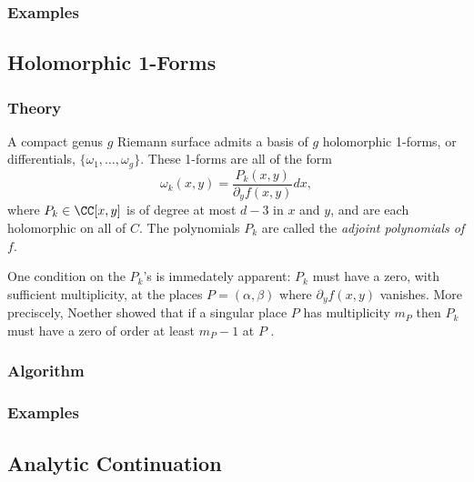 \subsubsection*{Examples}
%

\subsection{Holomorphic 1-Forms}

%
\subsubsection*{Theory}
%

A compact genus $g$ Riemann surface admits a basis of $g$ holomorphic
1-forms, or differentials, $\{\omega_1, \ldots, \omega_g\}$. These
1-forms are all of the form
\begin{equation*}
  \omega_k(x,y) = \frac{P_k(x,y)}{\partial_y f(x,y)} dx,
\end{equation*}
where $P_k \in \CC[x,y]$ is of degree at most $d-3$ in $x$ and $y$, and
are each holomorphic on all of $C$. The polynomials $P_k$ are called the
{\it adjoint polynomials of $f$}.

One condition on the $P_k$'s is immedately apparent: $P_k$ must have a
zero, with sufficient multiplicity, at the places $P = (\alpha,\beta)$
where $\partial_y f(x,y)$ vanishes. More preciscely, Noether showed that
if a singular place $P$ has multiplicity $m_P$ then $P_k$ must have a
zero of order at least $m_P - 1$ at $P$ \cite{Noether83}.

%
\subsubsection*{Algorithm}
%
%
\subsubsection*{Examples}
%

\subsection{Analytic Continuation}

